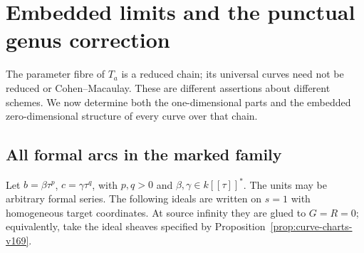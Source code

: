 \documentclass[11pt,reqno]{amsart}
\numberwithin{equation}{section}
\theoremstyle{definition}\newtheorem{definition}[theorem]{Definition}
\theoremstyle{remark}\newtheorem{remark}[theorem]{Remark}
\begin{document}
\section{Embedded limits and the punctual genus correction}
\label{sec:embedded-limits-v169}
The parameter fibre of $T_a$ is a reduced chain; its universal curves
need not be reduced or Cohen--Macaulay. These are different assertions
about different schemes. We now determine both the one-dimensional
parts and the embedded zero-dimensional structure of every curve over
that chain.

\subsection{All formal arcs in the marked family}
Let $b=\beta\tau^p$, $c=\gamma\tau^q$, with $p,q>0$ and
$\beta,\gamma\in k[[\tau]]^*$. The units may be arbitrary formal
series. The following ideals are written on $s=1$ with homogeneous
target coordinates. At source infinity they are glued to $G=R=0$;
equivalently, take the ideal sheaves specified by
Proposition~\ref{prop:curve-charts-v169}.
\end{document}
